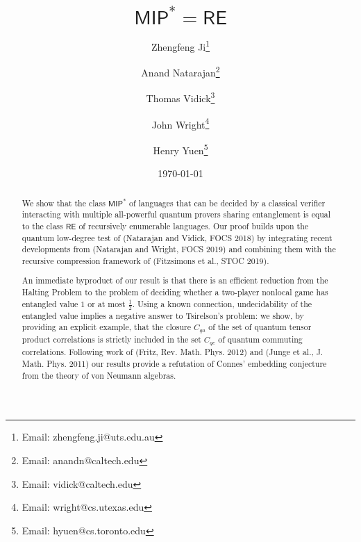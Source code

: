 \documentclass[11pt]{article}
\theoremstyle{definition}
\newcommand{\class}[1]{\ensuremath{\mathsf{#1}}\xspace}
\newcommand{\MIP}{\class{MIP}} %
\newcommand{\RE}{\class{RE}} %
\newcommand{\noteswarning}{{}}
\begin{document}
\title{$\MIP^* = \RE$}
\author[1]{Zhengfeng Ji\footnote{Email: zhengfeng.ji@uts.edu.au}}
\author[2,3]{Anand Natarajan\footnote{Email: anandn@caltech.edu}}
\author[3]{Thomas Vidick\footnote{Email: vidick@caltech.edu}}
\author[2,3,4]{John Wright\footnote{Email: wright@cs.utexas.edu}}
\author[5]{Henry Yuen\footnote{Email: hyuen@cs.toronto.edu}}

\date{\today}
\maketitle



\begin{abstract}
We show that the class $\MIP^*$ of languages that can be decided by a
classical verifier interacting with multiple all-powerful
quantum provers sharing entanglement is equal to the class $\RE$ of recursively
enumerable languages. Our proof builds upon the quantum low-degree test of (Natarajan and Vidick, FOCS 2018) by integrating recent developments from (Natarajan and Wright, FOCS 2019) and combining them with the recursive compression framework of (Fitzsimons et al., STOC 2019).

An immediate byproduct of our result is that there is an efficient reduction from the Halting Problem to the problem of deciding whether a two-player nonlocal game has entangled value $1$ or at most $\frac{1}{2}$.
Using a known connection, undecidability of the entangled value implies a negative answer to Tsirelson's problem: we show, by providing an explicit example, that the closure $C_{qa}$ of the set of quantum tensor product correlations is strictly included in the set $C_{qc}$ of quantum commuting correlations. Following work of (Fritz, Rev. Math. Phys. 2012) and (Junge et al., J. Math. Phys. 2011) our results provide a refutation of Connes' embedding conjecture from the theory of von Neumann algebras.

\end{abstract}

\newpage
\end{document}
